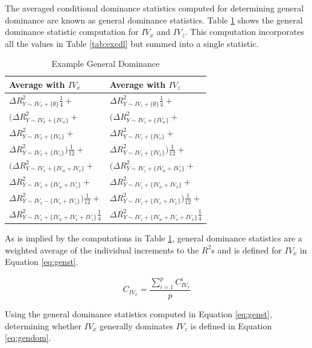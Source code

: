 \documentclass[doc]{apa7}
\begin{document}
	The averaged conditional dominance statistics computed for determining general dominance are known as general dominance statistics. 
	Table \ref{tab:exgen} shows the general dominance statistic computation for $IV_x$ and $IV_z$.
	This computation incorporates all the values in Table \ref{tab:excdl} but summed into a single statistic.
	
		\begin{table}[h!]
		\centering
		\caption{\centering Example General Dominance}
		\begin{tabular}{ l l }
			Average with $IV_x$ & Average with $IV_z$ \\
			\hline
			$\Delta R^2_{Y \sim IV_x + \{\emptyset\}}\frac{1}{4} + $ & $\Delta R^2_{Y \sim IV_z + \{\emptyset\}}\frac{1}{4} +$ \\
			$(\Delta R^2_{Y \sim IV_x + \{IV_w\}} + $ & $(\Delta R^2_{Y \sim IV_z + \{IV_w\}} + $ \\
			$\Delta R^2_{Y \sim IV_x + \{IV_v\}} + $ & $\Delta R^2_{Y \sim IV_z + \{IV_v\}} + $ \\
			$\Delta R^2_{Y \sim IV_x + \{IV_z\}})\frac{1}{12} + $ & $\Delta R^2_{Y \sim IV_z + \{IV_x\}})\frac{1}{12} + $ \\
			$(\Delta R^2_{Y \sim IV_x + \{IV_w + IV_v\}} + $ & $(\Delta R^2_{Y \sim IV_z + \{IV_w + IV_v\}} + $ \\
			$\Delta R^2_{Y \sim IV_x + \{IV_w + IV_z\}} + $ & $\Delta R^2_{Y \sim IV_z + \{IV_w + IV_x\}} + $ \\
			$\Delta R^2_{Y \sim IV_x - \{IV_v + IV_z\}})\frac{1}{12} + $ & $\Delta R^2_{Y \sim IV_z + \{IV_v + IV_x\}})\frac{1}{12} +$ \\
			$\Delta R^2_{Y \sim IV_x + \{IV_w + IV_v + IV_z\}}\frac{1}{4}$ & $\Delta R^2_{Y \sim IV_z + \{IV_w + IV_v + IV_x\}}\frac{1}{4}$ \\
			\hline
		\end{tabular}
		\label{tab:exgen}
	\end{table}

	As is implied by the computations in Table \ref{tab:exgen}, general dominance statistics are a weighted average of the individual increments to the $R^2$s and is defined for $IV_x$ in Equation \ref{eq:genst}.
	
	\begin{equation}
		C_{IV_x} = \frac{\sum^{p}_{i=1} C^i_{IV_x}}{p}
		\label{eq:genst}
	\end{equation}
	
	Using the general dominance statistics computed in Equation \ref{eq:genst}, determining whether $IV_x$ generally dominates $IV_z$ is defined in Equation \ref{eq:gendom}.
	
\end{document}
